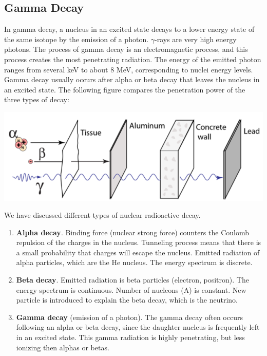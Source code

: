 \documentclass[11pt]{article}
\theoremstyle{break}
\theoremstyle{break}
\begin{document}
\subsection*{Gamma Decay}
In gamma decay, a nucleus in an excited state decays to a lower energy state of the same isotope by the emission of a photon. $\gamma$-rays are very high energy photons. The process of gamma decay is an electromagnetic process, and this process creates the most penetrating radiation. The energy of the emitted photon ranges from several keV to about 8 MeV, corresponding to nuclei energy levels.  Gamma decay usually occurs after alpha or beta decay that leaves the nucleus in an excited state. The following figure compares the penetration power of the three types of decay:
\begin{center}
\includegraphics[scale=0.55]{penetratePower}
\end{center}

We have discussed different types of nuclear radioactive decay. 
\begin{enumerate}
\item \textbf{Alpha decay}. Binding force (nuclear strong force) counters the Coulomb repulsion of the charges in the nucleus. Tunneling process means that there is a small probability that charges will escape the nucleus. Emitted radiation of alpha particles, which are the He nucleus. The energy spectrum is discrete.
\item \textbf{Beta decay}. Emitted radiation is beta particles (electron, positron). The energy spectrum is continuous. Number of nucleons (A) is constant. New particle is introduced to explain the beta decay, which is the neutrino.
\item \textbf{Gamma decay} (emission of a photon). The gamma decay often occurs following an alpha or beta decay, since the daughter nucleus is frequently left in an excited state.
This gamma radiation is highly penetrating, but less ionizing then alphas or betas.
\end{enumerate}
\end{document}
